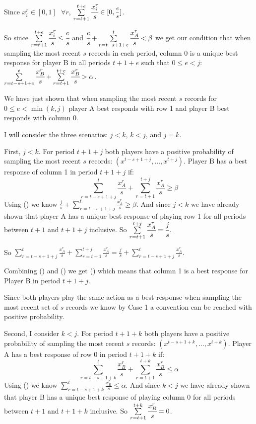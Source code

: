 \documentclass{article}
\begin{document}
Since $x_i^r \in [0,1] \hspace{8pt} \forall r$, $\sum\limits_{r=t+1}^{t+e} \cfrac{x^r_i}{s} \in [0,\mfrac{e}{s}]$.

So since $\sum\limits_{r=t+1}^{t+e} \cfrac{x^r_i}{s} \leq \cfrac{e}{s}$ and $\cfrac{e}{s}+\sum\limits_{r=t-s+1+e}^{t} \cfrac{x^r_A}{s} < \beta$ we get our condition that when sampling the most recent $s$ records in each period, column 0 is a unique best response for player B in all periods $t+1+e$ such that $0 \leq e<j$: $\sum\limits_{r=t-s+1+e}^{t}\cfrac{x^r_B}{s}+\sum\limits_{r=t+1}^{t+e} \cfrac{x^r_B}{s} > \alpha$.

\vskip12pt

We have just shown that when sampling the most recent $s$ records for $0 \leq e<\min (k,j)$ player A best responds with row 1 and player B best responds with column 0. 

\vskip12pt

I will consider the three scenarios: $j<k$, $k<j$, and $j=k$.

\vskip12pt

First, $j<k$. For period $t+1+j$ both players have a positive probability of sampling the most recent $s$ records: $(x^{t-s+1+j},...,x^{t+j})$. Player B has a best response of column 1 in period $t+1+j$ if:
$$\sum\limits_{r=t-s+1+j}^{t}\frac{x^r_A}{s}+\sum\limits_{r=t+1}^{t+j} \frac{x^r_A}{s} \geq \beta$$
Using () we know $\frac{j}{s}+\sum\limits_{r=t-s+1+j}^{t}\frac{x^r_A}{s} \geq \beta$. And since $j<k$ we have already shown that player A has a unique best response of playing row 1 for all periods between $t+1$ and $t+1+j$ inclusive. So $\sum\limits_{r=t+1}^{t+j} \cfrac{x^r_A}{s}=\cfrac{j}{s}$.

So $\sum\limits_{r=t-s+1+j}^{t}\frac{x^r_A}{s}+\sum\limits_{r=t+1}^{t+j} \frac{x^r_A}{s}=\frac{j}{s}+\sum\limits_{r=t-s+1+j}^{t}\frac{x^r_A}{s}$.

Combining () and () we get () which means that column 1 is a best response for Player B in period $t+1+j$.

Since both players play the same action as a best response when sampling the most recent set of $s$ records we know by Case 1 a convention can be reached with positive probability.

\vskip12pt

Second, I consider $k<j$. For period $t+1+k$ both players have a positive probability of sampling the most recent $s$ records: $(x^{t-s+1+k},...,x^{t+k})$. Player A has a best response of row 0 in period $t+1+k$ if:
$$\sum\limits_{r=t-s+1+k}^{t}\frac{x^r_B}{s}+\sum\limits_{r=t+1}^{t+k} \frac{x^r_B}{s} \leq \alpha$$
Using () we know $\sum\limits_{r=t-s+1+k}^{t}\frac{x^r_B}{s} \leq \alpha$. And since $k<j$ we have already shown that player B has a unique best response of playing column 0 for all periods between $t+1$ and $t+1+k$ inclusive. So $\sum\limits_{r=t+1}^{t+k} \cfrac{x^r_B}{s}=0$.
\end{document}
